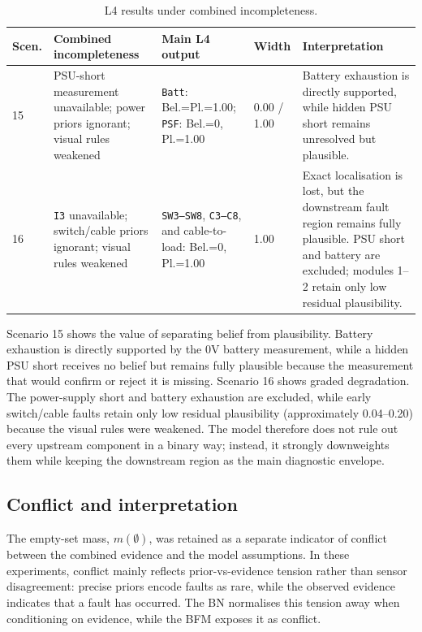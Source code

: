 \documentclass[runningheads]{llncs}
\begin{document}
\begin{table}[H]
\caption{L4 results under combined incompleteness.}\label{tab:l4_results}
\centering
\small
\begin{tabularx}{\textwidth}{p{0.8cm}p{3.0cm}p{4.3cm}p{1.1cm}X}
\toprule
Scen. & Combined incompleteness & Main L4 output & Width & Interpretation \\
\midrule
15 & PSU-short measurement unavailable; power priors ignorant; visual rules weakened & \texttt{Batt}: Bel.=Pl.=1.00; \texttt{PSF}: Bel.=0, Pl.=1.00 & 0.00 / 1.00 & Battery exhaustion is directly supported, while hidden PSU short remains unresolved but plausible. \\
16 & \texttt{I3} unavailable; switch/cable priors ignorant; visual rules weakened & \texttt{SW3--SW8}, \texttt{C3--C8}, and cable-to-load: Bel.=0, Pl.=1.00 & 1.00 & Exact localisation is lost, but the downstream fault region remains fully plausible. PSU short and battery are excluded; modules 1--2 retain only low residual plausibility. \\
\bottomrule
\end{tabularx}
\end{table}

Scenario 15 shows the value of separating belief from plausibility. Battery exhaustion is directly supported by the 0V battery measurement, while a hidden PSU short receives no belief but remains fully plausible because the measurement that would confirm or reject it is missing. Scenario 16 shows graded degradation. The power-supply short and battery exhaustion are excluded, while early switch/cable faults retain only low residual plausibility (approximately 0.04--0.20) because the visual rules were weakened. The model therefore does not rule out every upstream component in a binary way; instead, it strongly downweights them while keeping the downstream region as the main diagnostic envelope.

\subsection{Conflict and interpretation}
\label{sec:conflict_interpretation}

The empty-set mass, $m(\emptyset)$, was retained as a separate indicator of conflict between the combined evidence and the model assumptions. In these experiments, conflict mainly reflects prior-vs-evidence tension rather than sensor disagreement: precise priors encode faults as rare, while the observed evidence indicates that a fault has occurred. The BN normalises this tension away when conditioning on evidence, while the BFM exposes it as conflict.
\end{document}
